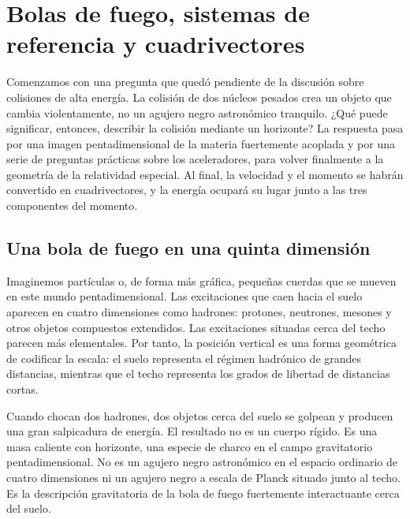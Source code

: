 \chapter{Bolas de fuego, sistemas de referencia y cuadrivectores}

Comenzamos con una pregunta que quedó pendiente de la discusión sobre colisiones de alta energía. La colisión de dos núcleos pesados crea un objeto que cambia violentamente, no un agujero negro astronómico tranquilo. ¿Qué puede significar, entonces, describir la colisión mediante un horizonte? La respuesta pasa por una imagen pentadimensional de la materia fuertemente acoplada y por una serie de preguntas prácticas sobre los aceleradores, para volver finalmente a la geometría de la relatividad especial. Al final, la velocidad y el momento se habrán convertido en cuadrivectores, y la energía ocupará su lugar junto a las tres componentes del momento.

\section{Una bola de fuego en una quinta dimensión}

\begin{classroomqa}\end{classroomqa}

Imaginemos partículas o, de forma más gráfica, pequeñas cuerdas que se mueven en este mundo pentadimensional. Las excitaciones que caen hacia el suelo aparecen en cuatro dimensiones como hadrones: protones, neutrones, mesones y otros objetos compuestos extendidos. Las excitaciones situadas cerca del techo parecen más elementales. Por tanto, la posición vertical es una forma geométrica de codificar la escala: el suelo representa el régimen hadrónico de grandes distancias, mientras que el techo representa los grados de libertad de distancias cortas.

Cuando chocan dos hadrones, dos objetos cerca del suelo se golpean y producen una gran salpicadura de energía. El resultado no es un cuerpo rígido. Es una masa caliente con horizonte, una especie de charco en el campo gravitatorio pentadimensional. No es un agujero negro astronómico en el espacio ordinario de cuatro dimensiones ni un agujero negro a escala de Planck situado junto al techo. Es la descripción gravitatoria de la bola de fuego fuertemente interactuante cerca del suelo.

